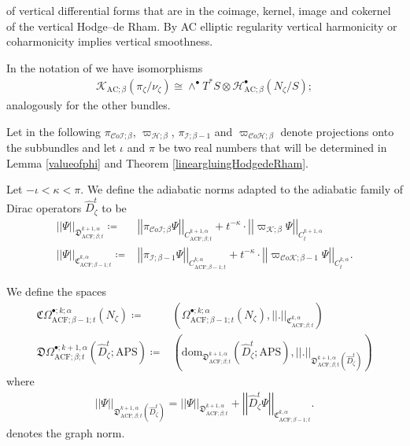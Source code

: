 \documentclass[psamsfonts]{amsart}
\theoremstyle{plain}
\theoremstyle{definition}{
\newtheorem{defi}{Definition}[section]
\newtheorem{ass}{Assumption}
\newtheorem*{nota}{Notation}}
\theoremstyle{remark}{
\newtheorem{rem}{Remark}
\newtheorem{ex}{Example}}
\theoremstyle{plain}{
\newtheorem{thm}{Theorem}[section]
\newtheorem{lem}{Lemma}[section]
\newtheorem{cor}{Corollary}[section]
\newtheorem{prop}{Proposition}[section]
\newtheorem{con}{Conjecture}[section]}
\newcommand{\m}[1]{{\mathrm{#1}}}
\begin{document}
of vertical differential forms that are in the coimage, kernel, image and cokernel of the vertical Hodge--de Rham. By AC elliptic regularity vertical harmonicity or coharmonicity implies vertical smoothness.
\begin{rem}
In the notation of \cite{majewskiDirac} we have isomorphisms
\begin{align*}
    \mathcal{K}_{\m{AC};\beta}(\pi_\zeta/\nu_\zeta)\cong\wedge^\bullet T^*S\otimes \mathcal{H}^\bullet_{\m{AC};\beta}(N_\zeta/S);
\end{align*}
analogously for the other bundles.
\end{rem}

Let in the following $\pi_{\mathcal{C}o\mathcal{I};\beta}$, $\varpi_{\mathcal{H};\beta}$, $\pi_{\mathcal{I};\beta-1}$ and $\varpi_{\mathcal{C}o\mathcal{H};\beta}$ denote projections onto the subbundles and let $\iota$ and $\pi$ be two real numbers that will be determined in Lemma \ref{valueofphi} and Theorem \ref{lineargluingHodgedeRham}.

\begin{defi}
Let $-\iota<\kappa<\pi$. We define the adiabatic norms adapted to the adiabatic family of Dirac operators $\widehat{D}^t_{\zeta}$ to be 
\begin{align}    
\label{adiabaticnormszeta}
    \left|\left|\Psi\right|\right|_{\mathfrak{D}^{k+1,\alpha}_{\m{ACF};\beta;t}}\coloneqq&\left|\left|\pi_{\mathcal{C}o\mathcal{I};\beta}\Psi\right|\right|_{C^{k+1,\alpha}_{\m{ACF};\beta;t}}+t^{-\kappa}\cdot \left|\left|\varpi_{\mathcal{K};\beta}\Psi\right|\right|_{C^{k+1,\alpha}_{t}}\\
    \left|\left|\Psi\right|\right|_{\mathfrak{C}^{k,\alpha}_{\m{ACF};\beta-1;t}}\coloneqq&\left|\left|\pi_{\mathcal{I};\beta-1}\Psi\right|\right|_{C^{k,\alpha}_{\m{ACF};\beta-1;t}}+t^{-\kappa}\cdot \left|\left|\varpi_{\mathcal{C}o\mathcal{K};\beta-1}\Psi\right|\right|_{C^{k,\alpha}_{t}}.
\end{align}
\end{defi}


\begin{defi}
We define the spaces
\begin{align*}
      \mathfrak{C}\Omega^{\bullet;k;\alpha}_{\m{ACF};\beta-1;t}(N_\zeta)\coloneqq&\left(\Omega^{\bullet;k;\alpha}_{\m{ACF};\beta-1;t}(N_\zeta),\left|\left|.\right|\right|_{\mathfrak{C}^{k,\alpha}_{\m{ACF};\beta;t}}\right)\\
      \mathfrak{D}\Omega^{\bullet;k+1,\alpha}_{\m{ACF};\beta;t}(\widehat{D}^t_{\zeta};\m{APS})\coloneqq&\left(\m{dom}_{  \mathfrak{D}^{k+1,\alpha}_{\m{ACF};\beta;t}}(\widehat{D}^t_{\zeta};\m{APS}),\left|\left|.\right|\right|_{  \mathfrak{D}^{k+1,\alpha}_{\m{ACF};\beta;t}(\widehat{D}^t_{\zeta})}\right)
\end{align*}
where
\begin{align*}
    \left|\left|\Psi\right|\right|_{  \mathfrak{D}^{k+1,\alpha}_{\m{ACF};\beta;t}(\widehat{D}^t_{\zeta})}=\left|\left|\Psi\right|\right|_{\mathfrak{D}^{k+1,\alpha}_{\m{ACF};\beta;t}}+\left|\left|\widehat{D}^t_{\zeta}\Psi\right|\right|_{\mathfrak{C}^{k,\alpha}_{\m{ACF};\beta-1;t}}.
\end{align*}
denotes the graph norm.
\end{defi}
\end{document}
